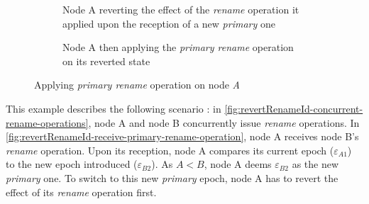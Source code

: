 \documentclass[sigplan,10pt]{acmart}
\newcommand{\trm}[1]{\mathit{#1}}
\newcommand{\id}[3]{$\trm{#1}^{\trm{#2}}_{\trm{#3}}$}
\newcommand{\epoch}[1]{$\varepsilon_{#1}$}
\newcommand{\widthletter}{2em}
\newcommand{\widthoriginepoch}{1.65em}
\newcommand{\widthepoch}{1.8em}
\begin{document}
\begin{figure}[ht!]
\begin{subfigure}{\columnwidth}
        \caption{Node A reverting the effect of the \emph{rename} operation it applied upon the reception of a new \emph{primary} one}
        \label{fig:revertRenameId-receive-primary-rename-operation}
    \end{subfigure}
    \begin{subfigure}{\columnwidth}
        \centering
        \caption{Node A then applying the \emph{primary rename} operation on its reverted state}
        \label{fig:revertRenameId-apply-rename}
    \end{subfigure}
    \caption{Applying \emph{primary rename} operation on node \emph{A}}
    \label{fig:revertRenameId}
\end{figure}

This example describes the following scenario : in \autoref{fig:revertRenameId-concurrent-rename-operations}, node A and node B concurrently issue \emph{rename} operations.
In \autoref{fig:revertRenameId-receive-primary-rename-operation}, node A receives node B's \emph{rename} operation.
Upon its reception, node A compares its current epoch (\epoch{A1}) to the new epoch introduced (\epoch{B2}).
As $A < B$, node A deems \epoch{B2} as the new \emph{primary} one.
To switch to this new \emph{primary} epoch, node A has to revert the effect of its \emph{rename} operation first.
\end{document}
